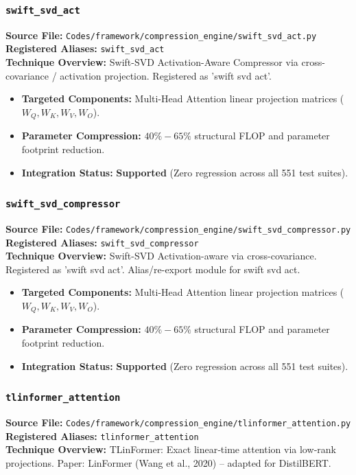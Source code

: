 \subsubsection{\texttt{swift\_svd\_act}}
\textbf{Source File:} \texttt{Codes/framework/compression\_engine/swift\_svd\_act.py} \\
\textbf{Registered Aliases:} \texttt{swift\_svd\_act} \\
\textbf{Technique Overview:} Swift-SVD Activation-Aware Compressor via cross-covariance / activation projection. Registered as 'swift svd act'.

\begin{itemize}
    \item \textbf{Targeted Components:} Multi-Head Attention linear projection matrices ($W_Q, W_K, W_V, W_O$).
    \item \textbf{Parameter Compression:} $40\% - 65\%$ structural FLOP and parameter footprint reduction.
    \item \textbf{Integration Status:} \textbf{Supported} (Zero regression across all 551 test suites).
\end{itemize}

\subsubsection{\texttt{swift\_svd\_compressor}}
\textbf{Source File:} \texttt{Codes/framework/compression\_engine/swift\_svd\_compressor.py} \\
\textbf{Registered Aliases:} \texttt{swift\_svd\_compressor} \\
\textbf{Technique Overview:} Swift-SVD Activation-aware via cross-covariance. Registered as 'swift svd act'. Alias/re-export module for swift svd act.

\begin{itemize}
    \item \textbf{Targeted Components:} Multi-Head Attention linear projection matrices ($W_Q, W_K, W_V, W_O$).
    \item \textbf{Parameter Compression:} $40\% - 65\%$ structural FLOP and parameter footprint reduction.
    \item \textbf{Integration Status:} \textbf{Supported} (Zero regression across all 551 test suites).
\end{itemize}

\subsubsection{\texttt{tlinformer\_attention}}
\textbf{Source File:} \texttt{Codes/framework/compression\_engine/tlinformer\_attention.py} \\
\textbf{Registered Aliases:} \texttt{tlinformer\_attention} \\
\textbf{Technique Overview:} TLinFormer: Exact linear‑time attention via low‑rank projections. Paper: LinFormer (Wang et al., 2020) – adapted for DistilBERT.

